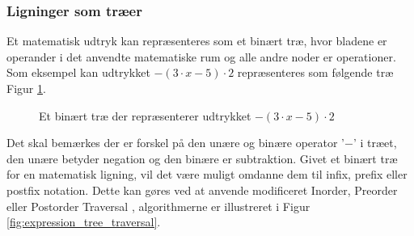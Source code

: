 \documentclass{article}
\begin{document}
 

\subsubsection{Ligninger som træer}
Et matematisk udtryk kan repræsenteres som et binært træ, hvor bladene er operander i det anvendte matematiske rum og alle andre noder er operationer. Som eksempel kan udtrykket $-(3 \cdot x - 5) \cdot 2$ repræsenteres som følgende træ Figur \ref{fig:expression_tree}. 


\begin{figure}[H]
\centering
{}
\caption{Et binært træ der repræsenterer udtrykket $-(3 \cdot x - 5) \cdot 2$}
\label{fig:expression_tree}
\end{figure}
Det skal bemærkes der er forskel på den unære og binære operator '$-$' i træet, den unære betyder negation og den binære er subtraktion. Givet et binært træ for en matematisk ligning, vil det være muligt omdanne dem til infix, prefix eller postfix notation. Dette kan gøres ved at anvende modificeret Inorder, Preorder eller Postorder Traversal , algorithmerne er illustreret i Figur \ref{fig:expression_tree_traversal}.
\end{document}
